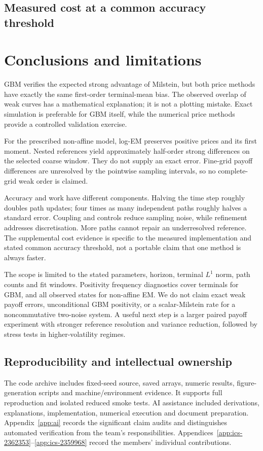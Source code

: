 \documentclass[11pt,a4paper]{article}
\begin{document}
\subsection{Measured cost at a common accuracy threshold}\label{sec:cost}

\newpage

\section{Conclusions and limitations}\label{sec:conclusions}
GBM verifies the expected strong advantage of Milstein, but both price methods have exactly the same first-order terminal-mean bias. The observed overlap of weak curves has a mathematical explanation; it is not a plotting mistake. Exact simulation is preferable for GBM itself, while the numerical price methods provide a controlled validation exercise.

For the prescribed non-affine model, log-EM preserves positive prices and its first moment. Nested references yield approximately half-order strong differences on the selected coarse window. They do not supply an exact error. Fine-grid payoff differences are unresolved by the pointwise sampling intervals, so no complete-grid weak order is claimed.

Accuracy and work have different components. Halving the time step roughly doubles path updates; four times as many independent paths roughly halves a standard error. Coupling and controls reduce sampling noise, while refinement addresses discretisation. More paths cannot repair an underresolved reference. The supplemental cost evidence is specific to the measured implementation and stated common accuracy threshold, not a portable claim that one method is always faster.

The scope is limited to the stated parameters, horizon, terminal $L^1$ norm, path counts and fit windows. Positivity frequency diagnostics cover terminals for GBM, and all observed states for non-affine EM. We do not claim exact weak payoff errors, unconditional GBM positivity, or a scalar-Milstein rate for a noncommutative two-noise system. A useful next step is a larger paired payoff experiment with stronger reference resolution and variance reduction, followed by stress tests in higher-volatility regimes.

\subsection*{Reproducibility and intellectual ownership}
The code archive includes fixed-seed source, saved arrays, numeric results, figure-generation scripts and machine/environment evidence. It supports full reproduction and isolated reduced smoke tests. AI assistance included derivations, explanations, implementation, numerical execution and document preparation. Appendix~\ref{app:ai} records the significant claim audits and distinguishes automated verification from the team's responsibilities. Appendices~\ref{app:ics-2362353}--\ref{app:ics-2359968} record the members' individual contributions.
\end{document}
